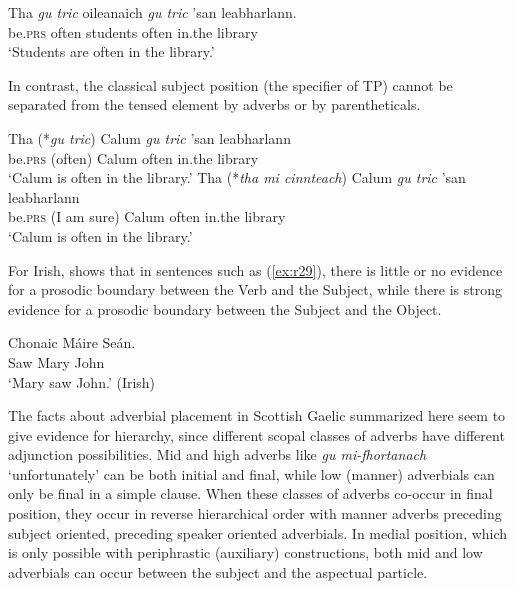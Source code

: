 \documentclass[output=paper,colorlinks,citecolor=brown]{langscibook}
\begin{document}
\ea\label{ex:r26}
\gll Tha {\textit{gu tric}} oileanaich  {\textit{gu tric}} 'san leabharlann.\\
be.\textsc{prs} often students often in.the library \\
\glt `Students are often in the library.'
\z

In contrast, the classical subject position (the specifier of TP) cannot be separated from the tensed element by adverbs or by parentheticals.

\ea\label{ex:r27}
\gll Tha {(*\textit{gu tric})} Calum {\textit{gu tric}}  'san leabharlann \\
be.\textsc{prs} (often) Calum often in.the library \\
\glt `Calum is often in the library.'
\ex\label{ex:r28}
\gll Tha {(*\textit{tha mi cinnteach})} Calum {\textit{gu tric}}  'san leabharlann \\
be.\textsc{prs} ({I am sure}) Calum  often  in.the library \\
\glt `Calum is often in the library.'
\z

For Irish, \citet{Elfner2015}  shows  that in sentences such as (\ref{ex:r29}), there is little or no evidence for a prosodic boundary between the Verb and the Subject, while there is strong evidence for a prosodic boundary between the Subject and the Object.

\ea\label{ex:r29}
\gll Chonaic M\'{a}ire Se\'{a}n.\\
Saw Mary John\\
\glt`Mary saw John.' (Irish)
\z

The facts about adverbial placement in Scottish Gaelic summarized here seem to give  evidence for hierarchy, since different scopal classes of adverbs  have different adjunction possibilities. Mid and high adverbs like  \textit{gu mi-fhortanach} `unfortunately'  can be both initial and final, while low (manner) adverbials can only be final in a simple clause. When these classes of adverbs co-occur in final position, they occur in reverse hierarchical order with manner adverbs preceding subject oriented, preceding speaker oriented adverbials. In medial position, which is only possible with periphrastic (auxiliary) constructions, both mid and low adverbials can occur between the subject and the aspectual particle.
\end{document}
